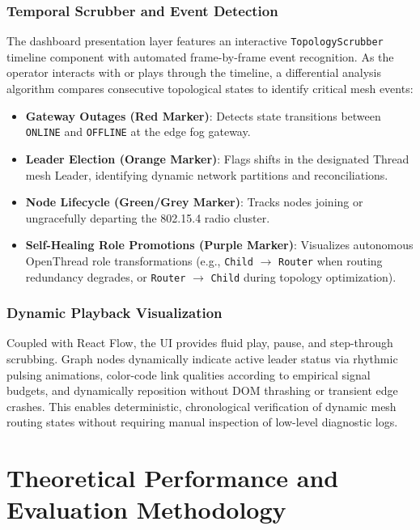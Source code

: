 \documentclass[conference]{IEEEtran}
\begin{document}
\subsubsection{Temporal Scrubber and Event Detection}
The dashboard presentation layer features an interactive \texttt{TopologyScrubber} timeline component with automated frame-by-frame event recognition. As the operator interacts with or plays through the timeline, a differential analysis algorithm compares consecutive topological states to identify critical mesh events:
\begin{itemize}
\setlength{\itemsep}{0pt}
\item \textbf{Gateway Outages (Red Marker)}: Detects state transitions between \texttt{ONLINE} and \texttt{OFFLINE} at the edge fog gateway.
\item \textbf{Leader Election (Orange Marker)}: Flags shifts in the designated Thread mesh Leader, identifying dynamic network partitions and reconciliations.
\item \textbf{Node Lifecycle (Green/Grey Marker)}: Tracks nodes joining or ungracefully departing the 802.15.4 radio cluster.
\item \textbf{Self-Healing Role Promotions (Purple Marker)}: Visualizes autonomous OpenThread role transformations (e.g., \texttt{Child} $\rightarrow$ \texttt{Router} when routing redundancy degrades, or \texttt{Router} $\rightarrow$ \texttt{Child} during topology optimization).
\end{itemize}

\subsubsection{Dynamic Playback Visualization}
Coupled with React Flow, the UI provides fluid play, pause, and step-through scrubbing. Graph nodes dynamically indicate active leader status via rhythmic pulsing animations, color-code link qualities according to empirical signal budgets, and dynamically reposition without DOM thrashing or transient edge crashes. This enables deterministic, chronological verification of dynamic mesh routing states without requiring manual inspection of low-level diagnostic logs.

\section{Theoretical Performance and Evaluation Methodology}
\end{document}
